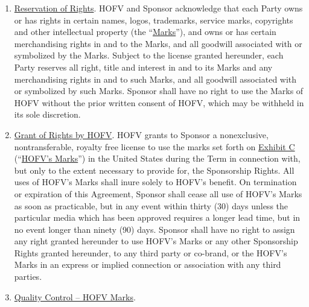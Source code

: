 \documentclass[]{article}
\begin{document}
\begin{enumerate}
  \begin{enumerate}
  \def\labelenumii{\arabic{enumii}.}
  \item
    \uline{Reservation of Rights}. HOFV and Sponsor acknowledge that
    each Party owns or has rights in certain names, logos, trademarks,
    service marks, copyrights and other intellectual property (the
    ``\uline{Marks}''), and owns or has certain merchandising rights in
    and to the Marks, and all goodwill associated with or symbolized by
    the Marks. Subject to the license granted hereunder, each Party
    reserves all right, title and interest in and to its Marks and any
    merchandising rights in and to such Marks, and all goodwill
    associated with or symbolized by such Marks. Sponsor shall have no
    right to use the Marks of HOFV without the prior written consent of
    HOFV, which may be withheld in its sole discretion.
  \item
    \uline{Grant of Rights by HOFV}. HOFV grants to Sponsor a
    nonexclusive, nontransferable, royalty free license to use the marks
    set forth on \uline{Exhibit C} (``\uline{HOFV's Marks}'') in the
    United States during the Term in connection with, but only to the
    extent necessary to provide for, the Sponsorship Rights. All uses of
    HOFV's Marks shall inure solely to HOFV's benefit. On termination or
    expiration of this Agreement, Sponsor shall cease all use of HOFV's
    Marks as soon as practicable, but in any event within thirty (30)
    days unless the particular media which has been approved requires a
    longer lead time, but in no event longer than ninety (90) days.
    Sponsor shall have no right to assign any right granted hereunder to
    use HOFV's Marks or any other Sponsorship Rights granted hereunder,
    to any third party or co-brand, or the HOFV's Marks in an express or
    implied connection or association with any third parties.
  \item
    \uline{Quality Control -- HOFV Marks}.


\end{enumerate}
\end{enumerate}
\end{document}
